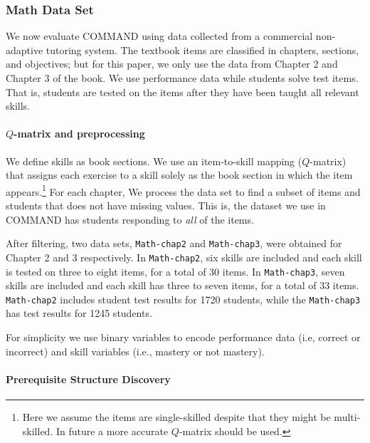 \documentclass{edm_template}
\begin{document}
	\subsubsection{Math Data Set}
	We now evaluate COMMAND using data collected from a commercial non-adaptive tutoring system.
	The textbook items are classified in chapters, sections, and objectives; but for this paper, we only use the data from Chapter 2 and Chapter 3 of the book.
	We use performance data while students solve test items. That is, students are tested on the items after they have been taught all relevant skills.
	
	\paragraph{$Q$-matrix and preprocessing}
	\label{sec:preprocessing}
	We define skills as book sections.
	We use an item-to-skill mapping ($Q$-matrix) that assigns each exercise to a skill solely as the book section in which the item appears.\footnote{Here we assume the items are single-skilled despite that they might be multi-skilled. In future a more accurate $Q$-matrix should be used.}
	For each chapter, We process the data set to find a subset of items and students that does not have missing values.
	This is,  the dataset we use in COMMAND has students responding to \textit{all} of the  items.
	
	After filtering, two data sets, \texttt{Math-chap2} and \texttt{Math-chap3}, were obtained for Chapter 2 and 3 respectively. 
	In \texttt{Math-chap2}, six skills are included and each skill is tested on three to eight items, for a total of 30  items.
	In \texttt{Math-chap3}, seven skills are included and each skill has three to seven items, for a total of 33 items.
	\texttt{Math-chap2} includes student test results for 1720 students, 
	while the \texttt{Math-chap3} has test results for 1245 students.
	
	For simplicity we use binary variables to encode  performance data (i.e, correct or incorrect) and skill variables  (i.e., mastery or not mastery).
	
	\paragraph{Prerequisite Structure Discovery}
	\label{sec:prerequisite_results}
	
\end{document}
